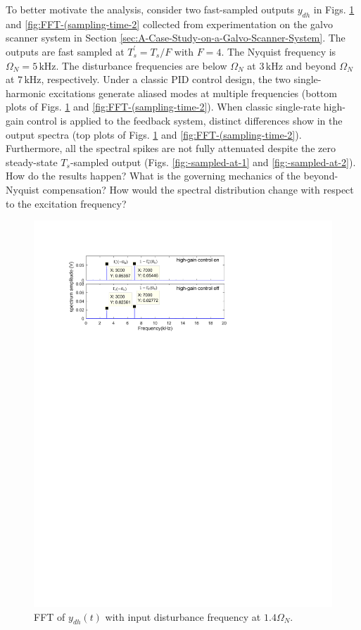 \documentclass [11pt, proquest] {uwthesis}[2020/02/24]
\begin{document}
To better motivate the analysis, consider two fast-sampled outputs
$y_{dh}$ in Figs. \ref{fig:FFT-(sampling-time-1} and \ref{fig:FFT-(sampling-time-2}
collected from experimentation on the galvo scanner system in
Section \ref{sec:A-Case-Study-on-a-Galvo-Scanner-System}. The outputs are fast
sampled at $T_{s}^{'}=T_{s}/F$ with $F=4$. The Nyquist frequency
is $\Omega_{N}=5\,\text{kHz}$. The disturbance frequencies are below
$\Omega_{N}$ at $3\,\text{kHz}$ and beyond $\Omega_{N}$ at $7\,\text{kHz}$,
respectively. Under a classic PID control design, the two single-harmonic
excitations generate aliased modes at multiple frequencies (bottom
plots of Figs. \ref{fig:FFT-(sampling-time-1} and \ref{fig:FFT-(sampling-time-2}).
When classic single-rate high-gain control \cite{XuChen_TCST2012}
is applied to the feedback system, distinct differences show in the
output spectra (top plots of Figs. \ref{fig:FFT-(sampling-time-1}
and \ref{fig:FFT-(sampling-time-2}). Furthermore, all the spectral
spikes are not fully attenuated despite the zero steady-state $T_{s}$-sampled
output (Figs. \ref{fig:-sampled-at-1} and \ref{fig:-sampled-at-2}).
How do the results happen? What is the governing mechanics of the
beyond-Nyquist compensation? How would the spectral distribution change
with respect to the excitation frequency?
\begin{figure}[!ht]
\begin{centering}
\includegraphics[width=12cm]{Spectral-analysis/FIG3.pdf}
\par\end{centering}
\caption{\label{fig:FFT-(sampling-time-1}FFT of $y_{dh}(t)$
with input disturbance frequency at $1.4\Omega_{N}$.}
\end{figure}
\end{document}
